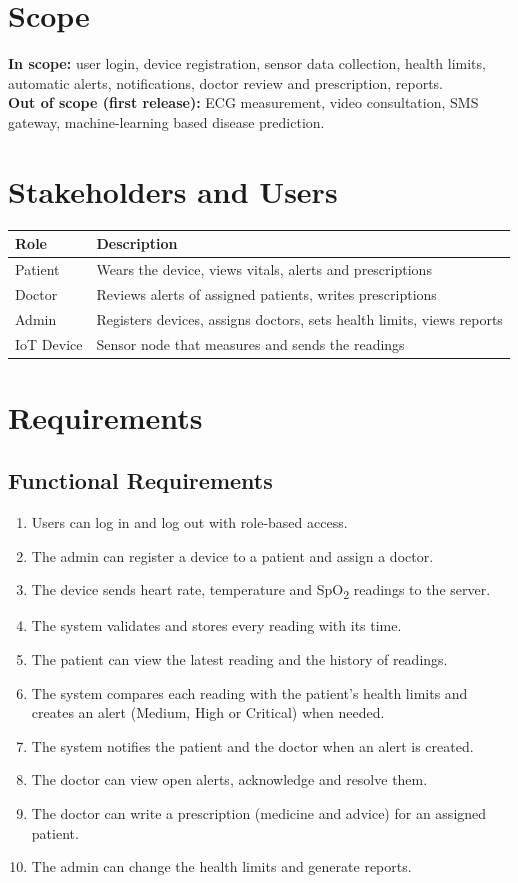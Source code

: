 \documentclass[12pt,a4paper]{article}
\begin{document}
\section{Scope}
\textbf{In scope:} user login, device registration, sensor data collection, health limits, automatic alerts, notifications, doctor review and prescription, reports.\\
\textbf{Out of scope (first release):} ECG measurement, video consultation, SMS gateway, machine-learning based disease prediction.

\section{Stakeholders and Users}
\begin{tabular}{@{}ll@{}}
\toprule
\textbf{Role} & \textbf{Description}\\
\midrule
Patient & Wears the device, views vitals, alerts and prescriptions\\
Doctor & Reviews alerts of assigned patients, writes prescriptions\\
Admin & Registers devices, assigns doctors, sets health limits, views reports\\
IoT Device & Sensor node that measures and sends the readings\\
\bottomrule
\end{tabular}

\section{Requirements}
\subsection{Functional Requirements}
\begin{enumerate}[noitemsep]
  \item[FR1] Users can log in and log out with role-based access.
  \item[FR2] The admin can register a device to a patient and assign a doctor.
  \item[FR3] The device sends heart rate, temperature and SpO\textsubscript{2} readings to the server.
  \item[FR4] The system validates and stores every reading with its time.
  \item[FR5] The patient can view the latest reading and the history of readings.
  \item[FR6] The system compares each reading with the patient's health limits and creates an alert (Medium, High or Critical) when needed.
  \item[FR7] The system notifies the patient and the doctor when an alert is created.
  \item[FR8] The doctor can view open alerts, acknowledge and resolve them.
  \item[FR9] The doctor can write a prescription (medicine and advice) for an assigned patient.
  \item[FR10] The admin can change the health limits and generate reports.
\end{enumerate}
\end{document}
